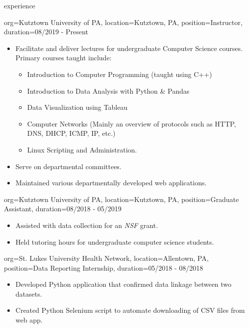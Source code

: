 \documentclass{resume}
\begin{document}
\makeheader

\begin{ResumeSection}{experience}
    \begin{ResumeSubsection}{org={Kutztown University of PA}, location={Kutztown, PA}, position={Instructor}, duration={08/2019 - Present}}
        \begin{itemize}
            \item Facilitate and deliver lectures for undergraduate Computer Science courses. Primary courses taught include: 
            \begin{itemize}
                \item Introduction to Computer Programming (taught using C++)
                \item Introduction to Data Analysis with Python \& Pandas
                \item Data Visualization using Tableau
                \item Computer Networks (Mainly an overview of protocols such as HTTP, DNS, DHCP, ICMP, IP, etc.)
                \item Linux Scripting and Administration.
            \end{itemize}
            \item Serve on departmental committees.
            \item Maintained various departmentally developed web applications. 
        \end{itemize}
    \end{ResumeSubsection}    
    \begin{ResumeSubsection}{org={Kutztown University of PA}, location={Kutztown, PA}, position={Graduate Assistant}, duration={08/2018 - 05/2019}}
        \begin{itemize}
            \item Assisted with data collection for an \emph{NSF} grant.
            \item Held tutoring hours for undergraduate computer science students. 
        \end{itemize}
    \end{ResumeSubsection}
    \begin{ResumeSubsection}{org={St. Lukes University Health Network}, location={Allentown, PA}, position={Data Reporting Internship}, duration={05/2018 - 08/2018}}
        \begin{itemize}
            \item Developed Python application that confirmed data linkage between two datasets. 
            \item Created Python Selenium script to automate downloading of CSV files from web app.
        \end{itemize}
    \end{ResumeSubsection}
\end{ResumeSection}
\end{document}

